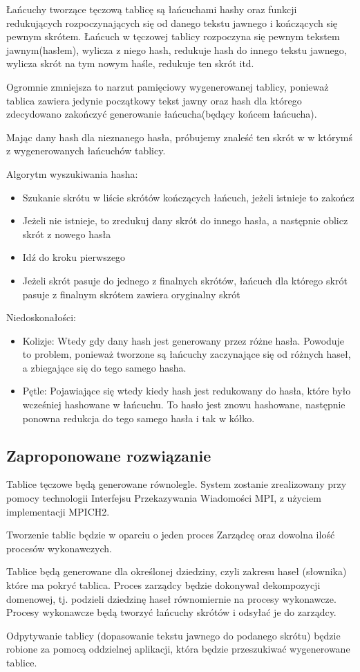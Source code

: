 \documentclass[a4paper,11pt]{article}
\begin{document}
Łańcuchy tworzące tęczową tablicę są łańcuchami hashy oraz funkcji redukujących rozpoczynających się od danego tekstu jawnego i kończących się pewnym skrótem. Łańcuch w tęczowej tablicy rozpoczyna się pewnym tekstem jawnym(hasłem), wylicza z niego hash, redukuje hash do innego tekstu jawnego, wylicza skrót na tym nowym haśle, redukuje ten skrót itd.

Ogromnie zmniejsza to narzut pamięciowy wygenerowanej tablicy, ponieważ tablica zawiera jedynie początkowy tekst jawny oraz hash dla którego zdecydowano zakończyć generowanie łańcucha(będący końcem łańcucha).

Mając dany hash dla nieznanego hasła, próbujemy znaleść ten skrót w w którymś z wygenerowanych łańcuchów tablicy.

Algorytm wyszukiwania hasha:
\begin{itemize}
  \item Szukanie skrótu w liście skrótów kończących łańcuch, jeżeli istnieje to zakończ
  \item Jeżeli nie istnieje, to zredukuj dany skrót do innego hasła, a następnie oblicz skrót z nowego hasła
  \item Idź do kroku pierwszego
  \item Jeżeli skrót pasuje do jednego z finalnych skrótów, łańcuch dla którego skrót pasuje z finalnym skrótem zawiera oryginalny skrót
\end{itemize}

Niedoskonałości:
\begin{itemize}
  \item Kolizje: Wtedy gdy dany hash jest generowany przez różne hasła. Powoduje to problem, ponieważ tworzone są łańcuchy zaczynające się od różnych haseł, a zbiegające się do tego samego hasha.
  \item Pętle: Pojawiające się wtedy kiedy hash jest redukowany do hasła, które było wcześniej hashowane w łańcuchu. To hasło jest znowu hashowane, następnie ponowna redukcja do tego samego hasła i tak w kółko.
\end{itemize}

\subsection{Zaproponowane rozwiązanie}
Tablice tęczowe będą generowane równolegle. System zostanie zrealizowany przy pomocy technologii Interfejsu Przekazywania Wiadomości MPI, z użyciem implementacji MPICH2.

Tworzenie tablic będzie w oparciu o jeden proces Zarządcę oraz dowolna ilość procesów wykonawczych. 

Tablice będą generowane dla określonej dziedziny, czyli zakresu haseł (słownika) które ma pokryć tablica. Proces zarządcy będzie dokonywał dekompozycji domenowej, tj. podzieli dziedzinę haseł równomiernie na procesy wykonawcze. Procesy wykonawcze będą tworzyć łańcuchy skrótów i odsyłać je do zarządcy.

Odpytywanie tablicy (dopasowanie tekstu jawnego do podanego skrótu) będzie robione za pomocą oddzielnej aplikacji, która będzie przeszukiwać wygenerowane tablice.
\end{document}
